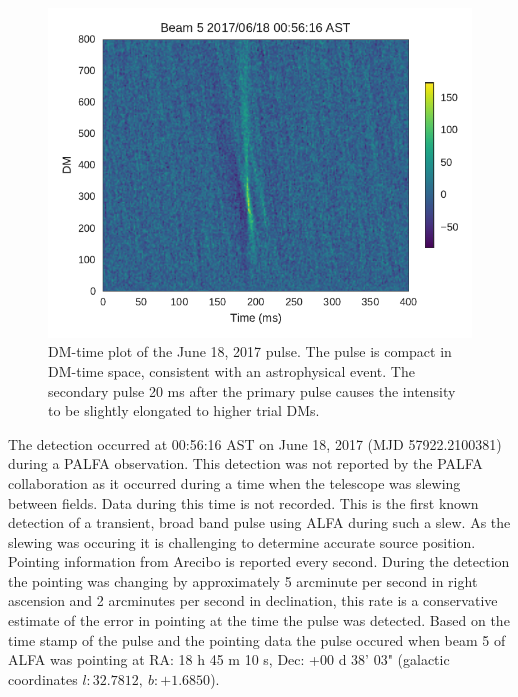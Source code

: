 \documentclass[a4paper,fleqn,usenatbib]{mnras}
\begin{document}
\begin{figure}
    \includegraphics[width=1.0\linewidth]{figures/Beam5_fb_D20170618T005616_buffer2_dmspace.pdf}
    \caption{DM-time plot of the June 18, 2017 pulse. The pulse is compact in
    DM-time space, consistent with an astrophysical event. The secondary pulse
    20 ms after the primary pulse causes the intensity to be slightly elongated
    to higher trial DMs.
    }
    \label{fig:D20170618_dmspace}
\end{figure}

The detection occurred at 00:56:16 AST on June 18, 2017 (MJD 57922.2100381)
during a PALFA observation. This detection was not reported by the PALFA
collaboration as it occurred during a time when the telescope was slewing between
fields. Data during this time is not recorded. This is the first known detection
of a transient, broad band pulse using ALFA during such a slew. As the slewing
was occuring it is challenging to determine accurate source position. Pointing
information from Arecibo is reported every second. During the detection the
pointing was changing by approximately 5 arcminute per second in right ascension
and 2 arcminutes per second in declination, this rate is a conservative estimate
of the error in pointing at the time the pulse was detected. Based on the time
stamp of the pulse and the pointing data the pulse occured when beam 5 of ALFA
was pointing at RA: 18 h 45 m 10 s, Dec: +00 d 38' 03" (galactic coordinates $l:
32.7812, ~b: +1.6850$).
\end{document}
